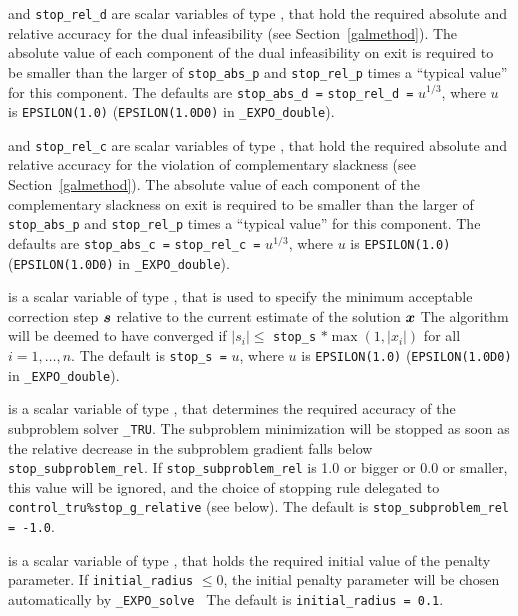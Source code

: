 \documentclass{galahad}
\newcommand{\packagename}{EXPO}
\newcommand{\fullpackagename}{\libraryname\_\packagename}
\newcommand{\solver}{{\tt \fullpackagename\_solve}}
\begin{document}
\begin{description}
 and {\tt stop\_rel\_d}
are scalar variables of type \realdp, that hold the
required absolute and relative accuracy for the dual infeasibility
(see Section~\ref{galmethod}).
The absolute value of each component of the dual infeasibility
on exit is required to be smaller than the larger of {\tt stop\_abs\_p} and
{\tt stop\_rel\_p} times a ``typical value'' for this component.
The defaults are {\tt stop\_abs\_d =} {\tt stop\_rel\_d =} $u^{1/3}$,
where $u$ is {\tt EPSILON(1.0)} ({\tt EPSILON(1.0D0)} in
{\tt \fullpackagename\_double}).

 and {\tt stop\_rel\_c}
are scalar variables of type \realdp, that hold the required absolute and 
relative accuracy for the violation of complementary slackness
(see Section~\ref{galmethod}).
The absolute value of each component of the complementary slackness
on exit is required to be smaller than the larger of {\tt stop\_abs\_p} and
{\tt stop\_rel\_p} times a ``typical value'' for this component.
The defaults are {\tt stop\_abs\_c =} {\tt stop\_rel\_c =} $u^{1/3}$,
where $u$ is {\tt EPSILON(1.0)} ({\tt EPSILON(1.0D0)} in
{\tt \fullpackagename\_double}).

 is a scalar variable of type \realdp,
that is used to specify the minimum acceptable correction step ${\bm{s}}$
relative to the current estimate of the solution ${\bm{x}}$
The algorithm will be deemed to have converged if $|s_i| \leq$
{\tt stop\_s} $\ast \max( 1, |x_i|)$ for all $i = 1, \ldots, n$.
The default is {\tt stop\_s =} $u$,
where $u$ is {\tt EPSILON(1.0)} ({\tt EPSILON(1.0D0)} in
{\tt \fullpackagename\_double}).

 is a scalar variable of type \realdp, 
that determines the required accuracy of the subproblem solver
{\tt \libraryname\_TRU}. The subproblem minimization will be stopped as 
soon as the relative decrease in the subproblem gradient falls below 
{\tt stop\_subproblem\_rel}. If {\tt stop\_subproblem\_rel} is 1.0 or bigger 
or 0.0 or smaller, this value will be ignored, and the choice of stopping 
rule delegated to {\tt control\_tru\%stop\_g\_relative} (see below).
The default is {\tt stop\_subproblem\_rel = -1.0}.

 is a scalar variable of type \realdp, that holds
the required initial value of the penalty parameter. If
{\tt initial\_radius} $\leq 0$, the initial penalty parameter will be 
chosen automatically by \solver\
The default is {\tt initial\_radius = 0.1}.


\end{description}
\end{document}
